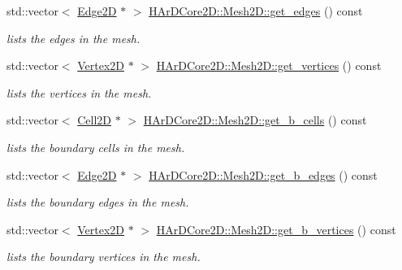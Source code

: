 \begin{DoxyCompactItemize}
std\+::vector$<$ \hyperlink{classHArDCore2D_1_1Edge2D}{Edge2D} $\ast$ $>$ \hyperlink{group__Mesh2D_ga5320100a180fdbe7de5547c05a6d48fd}{H\+Ar\+D\+Core2\+D\+::\+Mesh2\+D\+::get\+\_\+edges} () const
\begin{DoxyCompactList}\small\item\em lists the edges in the mesh. \end{DoxyCompactList}\item 
\mbox{\label{group__Mesh2D_ga9a25caa2da4d3047e9c6a5ebb52501ae}} 
std\+::vector$<$ \hyperlink{classHArDCore2D_1_1Vertex2D}{Vertex2D} $\ast$ $>$ \hyperlink{group__Mesh2D_ga9a25caa2da4d3047e9c6a5ebb52501ae}{H\+Ar\+D\+Core2\+D\+::\+Mesh2\+D\+::get\+\_\+vertices} () const
\begin{DoxyCompactList}\small\item\em lists the vertices in the mesh. \end{DoxyCompactList}\item 
\mbox{\label{group__Mesh2D_ga8fb293f0d674f0ea88b249e52ac59d1f}} 
std\+::vector$<$ \hyperlink{classHArDCore2D_1_1Cell2D}{Cell2D} $\ast$ $>$ \hyperlink{group__Mesh2D_ga8fb293f0d674f0ea88b249e52ac59d1f}{H\+Ar\+D\+Core2\+D\+::\+Mesh2\+D\+::get\+\_\+b\+\_\+cells} () const
\begin{DoxyCompactList}\small\item\em lists the boundary cells in the mesh. \end{DoxyCompactList}\item 
\mbox{\label{group__Mesh2D_ga9cd5463239645bfce1a86d3d434777f7}} 
std\+::vector$<$ \hyperlink{classHArDCore2D_1_1Edge2D}{Edge2D} $\ast$ $>$ \hyperlink{group__Mesh2D_ga9cd5463239645bfce1a86d3d434777f7}{H\+Ar\+D\+Core2\+D\+::\+Mesh2\+D\+::get\+\_\+b\+\_\+edges} () const
\begin{DoxyCompactList}\small\item\em lists the boundary edges in the mesh. \end{DoxyCompactList}\item 
\mbox{\label{group__Mesh2D_ga2a92915e178d63480f93e3c452b91f24}} 
std\+::vector$<$ \hyperlink{classHArDCore2D_1_1Vertex2D}{Vertex2D} $\ast$ $>$ \hyperlink{group__Mesh2D_ga2a92915e178d63480f93e3c452b91f24}{H\+Ar\+D\+Core2\+D\+::\+Mesh2\+D\+::get\+\_\+b\+\_\+vertices} () const
\begin{DoxyCompactList}\small\item\em lists the boundary vertices in the mesh. \end{DoxyCompactList}\item 

\end{DoxyCompactItemize}
